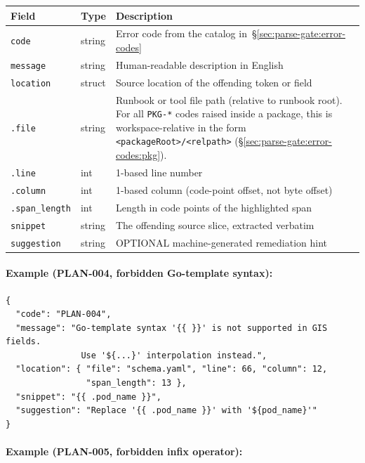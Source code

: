 \begin{center}\small
\begin{tabular}{p{2.8cm}p{2.2cm}p{7.5cm}}
\hline
\textbf{Field} & \textbf{Type} & \textbf{Description} \\
\hline
\texttt{code}     & string  & Error code from the catalog in~\S\ref{sec:parse-gate:error-codes} \\
\texttt{message}  & string  & Human-readable description in English \\
\texttt{location} & struct  & Source location of the offending token or field \\
\quad\texttt{.file}       & string & Runbook or tool file path (relative to runbook root). For all \texttt{PKG-*} codes raised inside a package, this is workspace-relative in the form \texttt{<packageRoot>/<relpath>} (\S\ref{sec:parse-gate:error-codes:pkg}). \\
\quad\texttt{.line}       & int    & 1-based line number \\
\quad\texttt{.column}     & int    & 1-based column (code-point offset, not byte offset) \\
\quad\texttt{.span\_length} & int  & Length in code points of the highlighted span \\
\texttt{snippet}    & string & The offending source slice, extracted verbatim \\
\texttt{suggestion} & string & OPTIONAL machine-generated remediation hint \\
\hline
\end{tabular}
\end{center}

\paragraph{Example (PLAN-004, forbidden Go-template syntax):}

\begin{verbatim}
{
  "code": "PLAN-004",
  "message": "Go-template syntax '{{ }}' is not supported in GIS fields.
               Use '${...}' interpolation instead.",
  "location": { "file": "schema.yaml", "line": 66, "column": 12,
                "span_length": 13 },
  "snippet": "{{ .pod_name }}",
  "suggestion": "Replace '{{ .pod_name }}' with '${pod_name}'"
}
\end{verbatim}

\paragraph{Example (PLAN-005, forbidden infix operator):}

